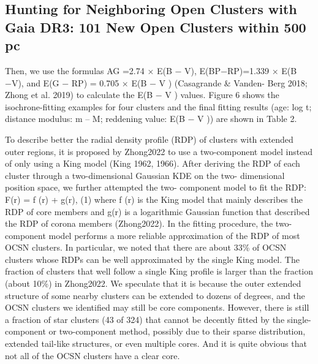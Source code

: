 \documentclass[../Main.tex]{subfiles}
\begin{document}
{\subsection{Hunting for Neighboring Open Clusters with Gaia DR3: 101 New Open Clusters within 500 pc} %
Then, we use the formulas AG =2.74 × E(B − V), E(BP−RP)=1.339 × E(B −V), and E(G − RP) = 0.705 × E(B − V ) (Casagrande & Vanden- Berg 2018; Zhong et al. 2019) to calculate the E(B − V ) values. Figure 6 shows the isochrone-fitting examples for four clusters and the final fitting results (age: log t; distance modulus: m – M;
reddening value: E(B − V )) are shown in Table 2.

To describe better the radial density profile (RDP) of clusters with extended outer regions, it is proposed by Zhong2022 to use a two-component model instead of only using a King model (King 1962, 1966). After deriving the RDP of each cluster through a two-dimensional Gaussian KDE on the two- dimensional position space, we further attempted the two- component model to fit the RDP:
F(r) = f (r) + g(r), (1) %
where f (r) is the King model that mainly describes the RDP of core members and g(r) is a logarithmic Gaussian function that described the RDP of corona members (Zhong2022).
In the fitting procedure, the two-component model performs a more reliable approximation of the RDP of most OCSN clusters. In particular, we noted that there are about 33\% of OCSN clusters whose RDPs can be well approximated by the single King model. The fraction of clusters that well follow a single King profile is larger than the fraction (about 10\%) in Zhong2022. We speculate that it is because the outer extended structure of some nearby clusters can be extended to dozens of degrees, and the OCSN clusters we identified may still be core components. However, there is still a fraction of star clusters (43 of 324) that cannot be decently fitted by the single-component or two-component method, possibly due to their sparse distribution, extended tail-like structures, or even multiple cores. And it is quite obvious that not all of the OCSN clusters have a clear core.

}
\end{document}
